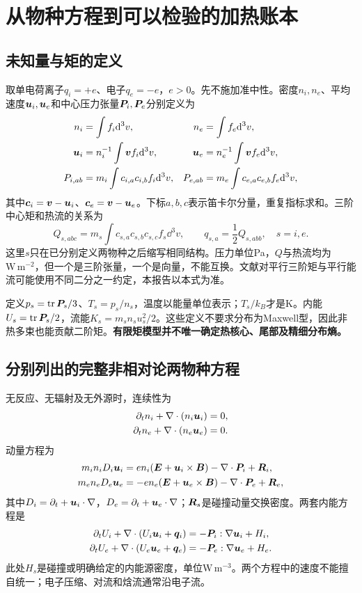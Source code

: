 \chapter{从物种方程到可以检验的加热账本}
\section{未知量与矩的定义}
取单电荷离子$q_i=+e$、电子$q_e=-e$，$e>0$。先不施加准中性。密度$n_i,n_e$、平均速度$\bm{u}_i,\bm{u}_e$和中心压力张量$\bm{P}_i,\bm{P}_e$分别定义为
\begin{align}
n_i&=\int f_i\mathrm d^3v,&n_e&=\int f_e\mathrm d^3v,\\
\bm{u}_i&=n_i^{-1}\int\bm{v} f_i\mathrm d^3v,&\bm{u}_e&=n_e^{-1}\int\bm{v} f_e\mathrm d^3v,\\
P_{i,ab}&=m_i\int c_{i,a}c_{i,b}f_i\mathrm d^3v,&P_{e,ab}&=m_e\int c_{e,a}c_{e,b}f_e\mathrm d^3v,
\end{align}
其中$\bm{c}_i=\bm{v}-\bm{u}_i$、$\bm{c}_e=\bm{v}-\bm{u}_e$。下标$a,b,c$表示笛卡尔分量，重复指标求和。三阶中心矩和热流的关系为
\begin{equation}
Q_{s,abc}=m_s\int c_{s,a}c_{s,b}c_{s,c}f_s\dd^3v,
\qquad q_{s,a}=\frac12 Q_{s,abb},\quad s=i,e.
\end{equation}
这里$s$只在已分别定义两物种之后缩写相同结构。压力单位Pa，$Q$与热流均为$\mathrm{W\,m^{-2}}$，但一个是三阶张量，一个是向量，不能互换。文献对平行三阶矩与平行能流可能使用不同二分之一约定，本报告以本式为准。

定义$p_s=\operatorname{tr}\bm{P}_s/3$、$T_s=p_s/n_s$，温度以能量单位表示；$T_s/k_B$才是K。内能$U_s=\operatorname{tr}\bm{P}_s/2$，流能$K_s=m_sn_su_s^2/2$。这些定义不要求分布为Maxwell型，因此非热多束也能贡献二阶矩。\textbf{有限矩模型并不唯一确定热核心、尾部及精细分布熵。}

\section{分别列出的完整非相对论两物种方程}
无反应、无辐射及无外源时，连续性为
\begin{align}
\partial_t n_i+\nabla\cdot(n_i\bm{u}_i)&=0,\\
\partial_t n_e+\nabla\cdot(n_e\bm{u}_e)&=0.
\end{align}
动量方程为
\begin{align}
m_in_iD_i\bm{u}_i&=en_i(\bm{E}+\bm{u}_i\times\bm{B})-\nabla\cdot\bm{P}_i+\bm{R}_i,\\
m_en_eD_e\bm{u}_e&=-en_e(\bm{E}+\bm{u}_e\times\bm{B})-\nabla\cdot\bm{P}_e+\bm{R}_e,
\end{align}
其中$D_i=\partial_t+\bm{u}_i\cdot\nabla$，$D_e=\partial_t+\bm{u}_e\cdot\nabla$；$\bm{R}_s$是碰撞动量交换密度。两套内能方程是
\begin{align}
\partial_tU_i+\nabla\cdot(U_i\bm{u}_i+\bm{q}_i)&=-\bm{P}_i:\nabla\bm{u}_i+H_i,\label{eq:Ui}\\
\partial_tU_e+\nabla\cdot(U_e\bm{u}_e+\bm{q}_e)&=-\bm{P}_e:\nabla\bm{u}_e+H_e.\label{eq:Ue}
\end{align}
此处$H_s$是碰撞或明确给定的内能源密度，单位$\mathrm{W\,m^{-3}}$。两个方程中的速度不能擅自统一；电子压缩、对流和焓流通常沿电子流。

